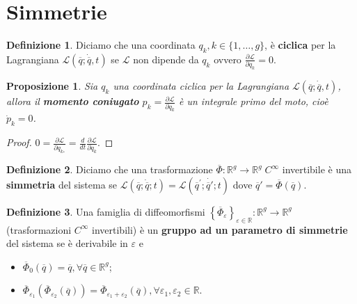 \documentclass{book}
\theoremstyle{plain}
\theoremstyle{plain}
\theoremstyle{plain}
\theoremstyle{plain}
\theoremstyle{plain}
\newtheorem{prop}{Proposizione}[chapter]
\theoremstyle{definition}
\newtheorem{defi}{Definizione}[chapter]
\theoremstyle{remark}
\theoremstyle{definition}
\begin{document}
\section{Simmetrie}

\begin{defi}
\everymath{\displaystyle}
    Diciamo che una coordinata $q_k, k \in \{1,\ldots,g\}$, è \textbf{ciclica} per la Lagrangiana $\mathcal{L}(\overline{q};\dot{\overline{q}},t)$ se $\mathcal{L}$ non dipende da $q_k$ ovvero $\frac{\partial\mathcal{L}}{\partial q_k}=0$.
\end{defi}

\begin{prop}
\everymath{\displaystyle}
    Sia $q_k$ una coordinata ciclica per la Lagrangiana $\mathcal{L}(\overline{q};\dot{\overline{q}},t)$, allora il \textbf{momento coniugato} $p_k=\frac{\partial \mathcal{L}}{\partial \dot{q}_k}$ è un integrale primo del moto, cioè $\dot{p}_k=0$.
\end{prop}

\begin{proof}
\everymath{\displaystyle}
    $0=\frac{\partial\mathcal{L}}{\partial q_{k_*}}=\frac{d}{dt}\frac{\partial\mathcal{L}}{\partial\Dot{q}_k}$.
\end{proof}

\begin{defi}
    Diciamo che una trasformazione $\overline{\Phi}:\mathbb{R}^g\to \mathbb{R}^g \; C^{\infty}$ invertibile è una \textbf{simmetria} del sistema se $\mathcal{L}(\overline{q};\dot{\overline{q}};t)=\mathcal{L}(\overline{q}^{\prime};\dot{\overline{q}'};t)$ dove $\overline{q}'=\overline{\Phi}(\overline{q})$.
\end{defi}

\begin{defi}
    Una famiglia di diffeomorfismi $\left\{\overline{\Phi}_{\varepsilon}\right\}_{\varepsilon\in\mathbb{R}}:\mathbb{R}^g\to\mathbb{R}^g$ (trasformazioni $C^\infty$ invertibili) è un \textbf{gruppo ad un parametro di simmetrie} del sistema se è derivabile in $\varepsilon$ e
    \begin{itemize}
        \item $\overline{\Phi}_0(\overline{q})=\overline{q}, \forall \overline{q}\in\mathbb{R}^g$;
        \item $\overline{\Phi}_{\varepsilon_1}\left(\overline{\Phi}_{\varepsilon_2}(\overline{q})\right)=\overline{\Phi}_{\varepsilon_1+\varepsilon_2}(\overline{q}), \forall \varepsilon_1, \varepsilon_2\in\mathbb{R}$.
    \end{itemize}
\end{defi}
\end{document}
